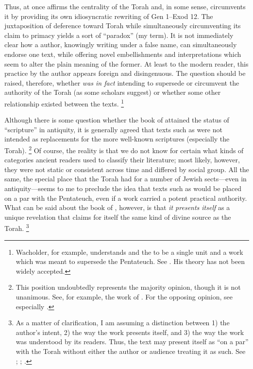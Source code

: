 
\noindent
Thus, \jub at once affirms the centrality of the Torah and, in some sense, circumvents it by providing its own idiosyncratic rewriting of Gen 1--Exod 12. The juxtaposition of deference toward Torah while simultaneously circumventing its claim to primacy yields a sort of ``\psgraphical paradox'' (my term). It is not immediately clear how a \psgraphical author, knowingly writing under a false name, can simultaneously endorse one text, while offering novel embellishments and interpretations which seem to alter the plain meaning of the former. At least to the modern reader, this practice by the \psgraphical author appears foreign and disingenuous. The question should be raised, therefore, whether \jub \emph{was in fact} intending to supersede or circumvent the authority of the Torah (as some scholars suggest) or whether some other relationship existed between the texts.%
    \footnote{%
        Wacholder, for example, understands \jub and the \templescroll to be a single unit and a work which was meant to supersede the Pentateuch. See 
        \cite{wacholder_kampen-etal1997}. His theory has not been widely accepted.}

Although there is some question whether the book of \jub attained the status of ``scripture'' in antiquity, it is generally agreed that \psgraphical texts such as \jub were not intended as replacements for the more well-known scriptures (especially the Torah).%
    \footnote{%
        This position undoubtedly represents the majority opinion, though it is not unanimous. See, for example, the work of 
        \cite{alexander_carson-williamson1988}. For the opposing opinion, see especially 
        \cite{wacholder_kampen-etal1997}.}
Of course, the reality is that we do not know for certain what kinds of categories ancient readers used to classify their literature; most likely, however, they were not static or consistent across time and differed by social group. All the same, the special place that the Torah had for a number of Jewish sects---even in antiquity---seems to me to preclude the idea that \psgraphical texts such as \jub would be placed on a par with the Pentateuch, even if a work carried a potent practical authority. What can be said about the book of \jub, however, is that \emph{it presents itself} as a unique revelation that claims for itself the same kind of divine source as the Torah.%
    \footnote{%
        As a matter of clarification, I am assuming a distinction between 1) the author's intent, 2) the way the work presents itself, and 3) the way the work was understood by its readers. Thus, the text may present itself as ``on a par'' with the Torah without either the author or audience treating it as such. See 
        \cite{nickelsburg_chazon-etal1999};
        \cite{endres_xeravits-etal2013};
        \cite{debel_jsj2014}.}

